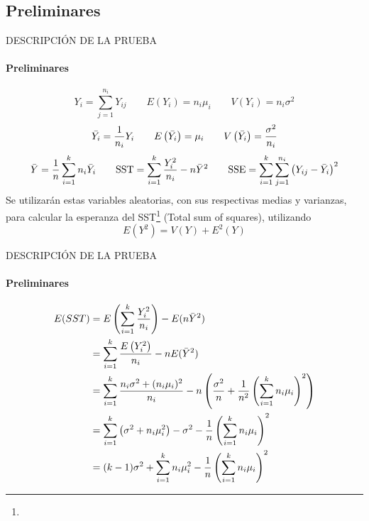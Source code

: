 \subsection{Preliminares}
\begin{frame}{DESCRIPCIÓN DE LA PRUEBA}
\framesubtitle{Preliminares}

    \begin{equation*}
        Y_i=\sum_{j=1}^{n_i}Y_{ij} \qquad E\left(Y_i\right)=n_i\mu_i \qquad V\left(Y_i\right)=n_i\sigma^2
    \end{equation*}
    \begin{equation*}
        \Bar{Y_i}=\dfrac{1}{n_i}Y_i \qquad E\left(\Bar{Y_i}\right)=\mu_i \qquad V\left(\Bar{Y_i}\right)=\dfrac{\sigma^2}{n_i}
    \end{equation*}
    \begin{equation*}
        \Bar{Y}=\dfrac{1}{n}\sum_{i=1}^kn_i\Bar{Y}_i\qquad\text{SST}=\sum_{i=1}^{k}\dfrac{Y_i^2}{n_i}-n\Bar{Y}^2\qquad \text{SSE}=\sum_{i=1}^{k}\sum_{j=1}^{n_i}\left(Y_{ij}-\Bar{Y}_i\right)^2
    \end{equation*}
    Se utilizarán estas variables aleatorias, con sus respectivas medias y varianzas, para calcular la esperanza del SST\footnote{} (Total sum of squares), utilizando
    \begin{equation*}
        E\left(Y^2\right)=V(Y)+E^2\left(Y\right)
    \end{equation*}
        
    
\end{frame}

\begin{frame}{DESCRIPCIÓN DE LA PRUEBA}
\framesubtitle{Preliminares}
\begin{equation*}
\begin{split}
    E(SST)&=E\left(\sum_{i=1}^k\dfrac{Y_i^2}{n_i}\right)-E(n\Bar{Y}^2)\\
    &=\sum_{i=1}^k\dfrac{E\left(Y_i^2\right)}{n_i}-nE(\Bar{Y}^2)\\
    &=\sum_{i=1}^k\dfrac{n_i\sigma^2+(n_i\mu_i)^2}{n_i}-n\left(\dfrac{\sigma^2}{n}+\dfrac{1}{n^2}\left(\sum_{i=1}^kn_i\mu_i\right)^2\right)\\
    &=\sum_{i=1}^k\left(\sigma^2+n_i\mu_i^2\right)-\sigma^2-\dfrac{1}{n}\left(\sum_{i=1}^kn_i\mu_i\right)^2\\
    &=(k-1)\sigma^2+\sum_{i=1}^kn_i\mu_i^2-\dfrac{1}{n}\left(\sum_{i=1}^kn_i\mu_i\right)^2
\end{split}
\end{equation*}
\end{frame}

